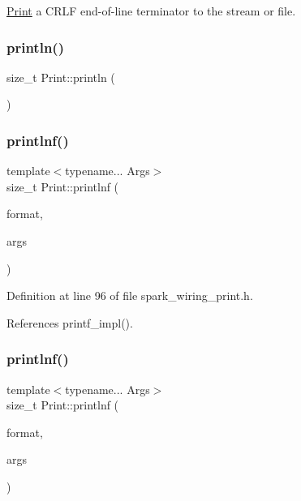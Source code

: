 \hyperlink{class_print}{Print} a C\+R\+LF end-\/of-\/line terminator to the stream or file. 

\mbox{\label{class_print_a4fd286b325d3b1a786cfa35072a8ef52}} 
\subsubsection{\texorpdfstring{println()}{println()}\hspace{0.1cm}{\footnotesize\ttfamily [21/21]}}
{\footnotesize\ttfamily size\+\_\+t Print\+::println (\begin{DoxyParamCaption}\item[{const \+\_\+\+\_\+\+Flash\+String\+Helper $\ast$}]{ }\end{DoxyParamCaption})}

\mbox{\label{class_print_afa41aa5211c54b7b4d79b9286880c337}} 
\subsubsection{\texorpdfstring{printlnf()}{printlnf()}\hspace{0.1cm}{\footnotesize\ttfamily [1/2]}}
{\footnotesize\ttfamily template$<$typename... Args$>$ \\
size\+\_\+t Print\+::printlnf (\begin{DoxyParamCaption}\item[{const char $\ast$}]{format,  }\item[{Args...}]{args }\end{DoxyParamCaption})\hspace{0.3cm}{\ttfamily [inline]}}



Definition at line 96 of file spark\+\_\+wiring\+\_\+print.\+h.



References printf\+\_\+impl().

\mbox{\label{class_print_afa41aa5211c54b7b4d79b9286880c337}} 
\subsubsection{\texorpdfstring{printlnf()}{printlnf()}\hspace{0.1cm}{\footnotesize\ttfamily [2/2]}}
{\footnotesize\ttfamily template$<$typename... Args$>$ \\
size\+\_\+t Print\+::printlnf (\begin{DoxyParamCaption}\item[{const char $\ast$}]{format,  }\item[{Args...}]{args }\end{DoxyParamCaption})\hspace{0.3cm}{\ttfamily [inline]}}



